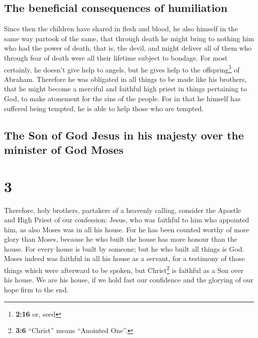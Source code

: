 \hypertarget{the-beneficial-consequences-of-humiliation}{%
\subsection{The beneficial consequences of
humiliation}\label{the-beneficial-consequences-of-humiliation}}

 Since then the children have shared in flesh and blood,
he also himself in the same way partook of the same, that through death
he might bring to nothing him who had the power of death, that is, the
devil,  and might deliver all of them who through fear of
death were all their lifetime subject to bondage.  For
most certainly, he doesn't give help to angels, but he gives help to the
offspring\footnote{\textbf{2:16} or, seed} of Abraham. 
Therefore he was obligated in all things to be made like his brothers,
that he might become a merciful and faithful high priest in things
pertaining to God, to make atonement for the sins of the people.
 For in that he himself has suffered being tempted, he is
able to help those who are tempted.

\hypertarget{the-son-of-god-jesus-in-his-majesty-over-the-minister-of-god-moses}{%
\subsection{The Son of God Jesus in his majesty over the minister of God
Moses}\label{the-son-of-god-jesus-in-his-majesty-over-the-minister-of-god-moses}}

\hypertarget{section-2}{%
\section{3}\label{section-2}}

 Therefore, holy brothers, partakers of a heavenly
calling, consider the Apostle and High Priest of our confession: Jesus,
 who was faithful to him who appointed him, as also Moses
was in all his house.  For he has been counted worthy of
more glory than Moses, because he who built the house has more honour
than the house.  For every house is built by someone; but
he who built all things is God.  Moses indeed was faithful
in all his house as a servant, for a testimony of those things which
were afterward to be spoken,  but Christ\footnote{\textbf{3:6}
  ``Christ'' means ``Anointed One''.} is faithful as a Son over his
house. We are his house, if we hold fast our confidence and the glorying
of our hope firm to the end.

